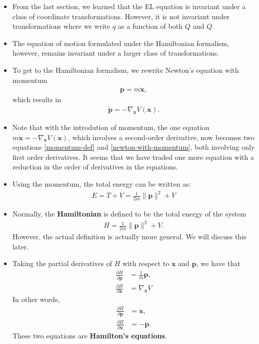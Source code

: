 \documentclass[10pt]{article}
\newcommand{\ve}[1]{\mathbf{#1}}
\begin{document}
  \begin{itemize}
  	\item From the last section, we learned that the EL equation is invariant under a class of coordinate transformations. However, it is not invariant under transformations where we write $q$ as a function of both $Q$ and $\dot{Q}$.

  	\item The equation of motion formulated under the Hamiltonian formalism, however, remains invariant under a larger class of transformations.

  	\item To get to the Hamiltonian formalism, we rewrite Newton's equation with momentum
  	\begin{align} \label{momentum-def}
  		\ve{p} = m \dot{\ve{x}},
  	\end{align}
  	which results in
  	\begin{align} \label{newton-with-momentum}
  		\dot{\ve{p}} = -\nabla_{\ve{x}}V(\ve{x}).
  	\end{align}

  	\item Note that with the introdution of momentum, the one equation $m\ddot{\ve{x}} = -\nabla_{\ve{x}}V(\ve{x})$, which involves a second-order derivative, now becomes two equations \eqref{momentum-def} and \eqref{newton-with-momentum}, both involving only first order derivatives. It seems that we have traded one more equation with a reduction in the order of derivatives in the equations.

  	\item Using the momentum, the total energy can be written as:
  	\begin{align*}
  		E = T + V = \frac{1}{2m}  \| \ve{p} \|^2 + V
  	\end{align*}

  	\item Normally, the {\bf Hamiltonian} is defined to be the total energy of the system
  	\begin{align*}
  		H = \frac{1}{2m}  \| \ve{p} \|^2 + V.
  	\end{align*}
  	However, the actual definition is actually more general. We will discuss this later.

  	\item Taking the partial derivatives of $H$ with respect to $\ve{x}$ and $\ve{p}$, we have that
  	\begin{align*}
  		\frac{\partial H}{\partial \ve{p}} &= \frac{1}{m}\ve{p}, \\
  		\frac{\partial H}{\partial \ve{x}} &= \nabla_{\ve{x}} V
  	\end{align*}
  	In other words,
  	\begin{align*}
  		\frac{\partial H}{\partial \ve{p}} &= \dot{\ve{x}}, \\
  		\frac{\partial H}{\partial \ve{x}} &= -\dot{\ve{p}}.
  	\end{align*}
  	These two equations are {\bf Hamilton's equations}.


\end{itemize}
\end{document}
